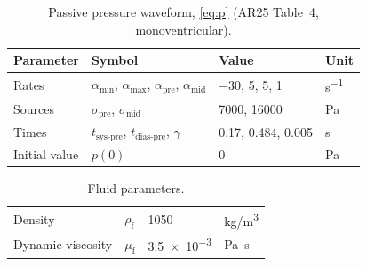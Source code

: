 \begin{table}[h]
\centering
\caption{Passive pressure waveform, \cref{eq:p} (AR25 Table~4, monoventricular).}
\label{tab:pressureparams}
\begin{tabular}{llll}
\toprule
Parameter & Symbol & Value & Unit \\
\midrule
Rates & $\alpha_{\min}$, $\alpha_{\max}$, $\alpha_{\mathrm{pre}}$, $\alpha_{\mathrm{mid}}$ & $-30$, 5, 5, 1 & \si{s^{-1}} \\
Sources & $\sigma_{\mathrm{pre}}$, $\sigma_{\mathrm{mid}}$ & 7000, 16000 & \si{Pa} \\
Times & $t_{\mathrm{sys\text{-}pre}}$, $t_{\mathrm{dias\text{-}pre}}$, $\gamma$ & 0.17, 0.484, 0.005 & \si{s} \\
Initial value & $p(0)$ & 0 & \si{Pa} \\
\bottomrule
\end{tabular}
\end{table}

\begin{table}[h]
\centering
\caption{Fluid parameters.}
\begin{tabular}{llll}
\toprule
Density & $\rho_{\mathrm f}$ & 1050 & \si{kg/m^3} \\
Dynamic viscosity & $\mu_{\mathrm f}$ & \num{3.5e-3} & \si{Pa.s} \\
\bottomrule
\end{tabular}
\end{table}
